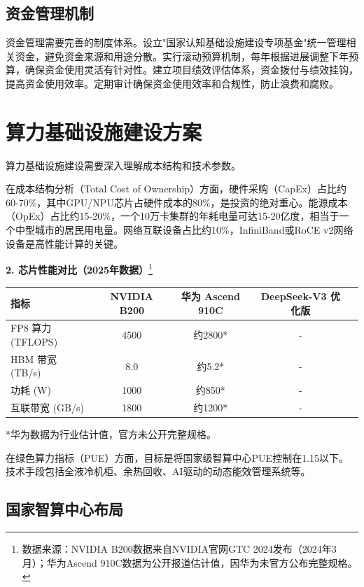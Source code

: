 \subsection{资金管理机制}

资金管理需要完善的制度体系。设立"国家认知基础设施建设专项基金"统一管理相关资金，避免资金来源和用途分散。实行滚动预算机制，每年根据进展调整下年预算，确保资金使用灵活有针对性。建立项目绩效评估体系，资金拨付与绩效挂钩，提高资金使用效率。定期审计确保资金使用效率和合规性，防止浪费和腐败。

\section{算力基础设施建设方案}

算力基础设施建设需要深入理解成本结构和技术参数。

在成本结构分析（Total Cost of Ownership）方面，硬件采购（CapEx）占比约60-70\%，其中GPU/NPU芯片占硬件成本的80\%，是投资的绝对重心。能源成本（OpEx）占比约15-20\%，一个10万卡集群的年耗电量可达15-20亿度，相当于一个中型城市的居民用电量。网络互联设备占比约10\%，InfiniBand或RoCE v2网络设备是高性能计算的关键。

\textbf{2. 芯片性能对比（2025年数据）}\footnote{数据来源：NVIDIA B200数据来自NVIDIA官网GTC 2024发布（2024年3月）；华为Ascend 910C数据为公开报道估计值，因华为未官方公布完整规格。}
\begin{table}[H]
\centering
\small
\begin{tabular}{lcccc}
\toprule
\textbf{指标} & \textbf{NVIDIA B200} & \textbf{华为 Ascend 910C} & \textbf{DeepSeek-V3 优化版} \\
\midrule
FP8 算力 (TFLOPS) & 4500 & 约2800* & - \\
HBM 带宽 (TB/s) & 8.0 & 约5.2* & - \\
功耗 (W) & 1000 & 约850* & - \\
互联带宽 (GB/s) & 1800 & 约1200* & - \\
\bottomrule
\end{tabular}
\end{table}
\small{*华为数据为行业估计值，官方未公开完整规格。}
\normalsize

在绿色算力指标（PUE）方面，目标是将国家级智算中心PUE控制在1.15以下。技术手段包括全液冷机柜、余热回收、AI驱动的动态能效管理系统等。

\subsection{国家智算中心布局}

